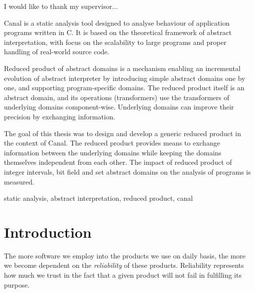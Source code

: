 \documentclass[12pt,oneside]{fithesis2}
\theoremstyle{definition}
\begin{document}
\FrontMatter
\ThesisTitlePage

\begin{ThesisDeclaration}
\DeclarationText
\AdvisorName
\end{ThesisDeclaration}

\begin{ThesisThanks}
I would like to thank my supervisor...
\end{ThesisThanks}

\begin{ThesisAbstract}
Canal is a static analysis tool designed to analyse behaviour of application programs written in C. It is based on the theoretical framework of abstract interpretation, with focus on the scalability to large programs and proper handling of real-world source code.

Reduced product of abstract domains is a mechanism enabling an incremental evolution of abstract interpreter by introducing simple abstract domains one by one, and supporting program-specific domains. The reduced product itself is an abstract domain, and its operations (transformers) use the transformers of underlying domains component-wise. Underlying domains can improve their precision by exchanging information.

The goal of this thesis was to design and develop a generic reduced product in the context of Canal. The reduced product provides means to exchange information between the underlying domains while keeping the domains themselves independent from each other. The impact of reduced product of integer intervals, bit field and set abstract domains on the analysis of programs is measured.
\end{ThesisAbstract}

\begin{ThesisKeyWords}
static analysis, abstract interpretation, reduced product, canal
\end{ThesisKeyWords}

\tableofcontents

\MainMatter
\chapter{Introduction}

The more software we employ into the products we use on daily basis, the more we become dependent on the \textit{reliability} of these products. Reliability represents how much we trust in the fact that a given product will not fail in fulfilling its purpose.
\end{document}
